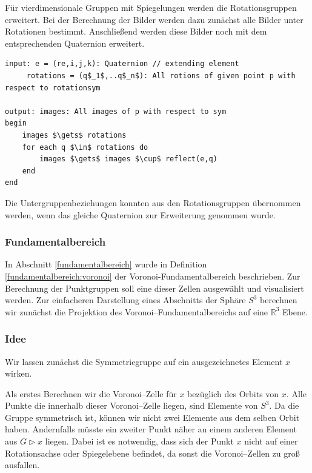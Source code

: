 Für vierdimensionale Gruppen mit Spiegelungen werden die Rotationsgruppen erweitert. Bei der Berechnung der Bilder werden dazu zunächst alle Bilder unter Rotationen bestimmt. Anschließend werden diese Bilder noch mit dem entsprechenden Quaternion erweitert. 
\begin{lstlisting}[mathescape, morekeywords={for, each, if, then, fi, do, begin,input, output, end, return}, caption={Peusdocode zur Berechnung aller Bilder unter Spiegelungen}, label=alg:images2]
input: e = (re,i,j,k): Quaternion // extending element
	 rotations = (q$_1$,..q$_n$): All rotions of given point p with respect to rotationsym
	
output: images: All images of p with respect to sym
begin	
	images $\gets$ rotations
	for each q $\in$ rotations do
		images $\gets$ images $\cup$ reflect(e,q)
	end
end 
\end{lstlisting}
Die Untergruppenbeziehungen konnten aus den Rotationsgruppen übernommen werden, wenn das gleiche Quaternion zur Erweiterung genommen wurde.
\\ 


    \subsubsection{Fundamentalbereich}
         In Abschnitt \ref{fundamentalbereich} wurde in Definition \ref{fundamentalbereich:voronoi} der Voronoi-Fundamentalbereich beschrieben. Zur Berechnung der Punktgruppen soll eine dieser Zellen ausgewählt und visualisiert werden.
         Zur einfacheren Darstellung eines Abschnitts der Sphäre $S^3$ berechnen wir zunächst die Projektion des Voronoi--Fundamentalbereichs auf eine $\mathbb{R}^3$ Ebene.
        \subsubsection*{Idee}
            Wir lassen zunächst die Symmetriegruppe auf ein ausgezeichnetes Element $x$ wirken.

            \noindent Als erstes Berechnen wir die Voronoi--Zelle für $x$ bezüglich des Orbits von $x$. Alle Punkte die innerhalb dieser Voronoi--Zelle liegen, sind Elemente von $S^3$. 
            Da die Gruppe symmetrisch ist, können wir nicht zwei Elemente aus dem selben Orbit haben. 
            Andernfalls müsste ein zweiter Punkt näher an einem anderen Element aus $G \rhd x$ liegen.
            Dabei ist es notwendig, dass sich der Punkt $x$ nicht auf einer Rotationsachse oder Spiegelebene befindet, da sonst die Voronoi--Zellen zu groß ausfallen.
            
